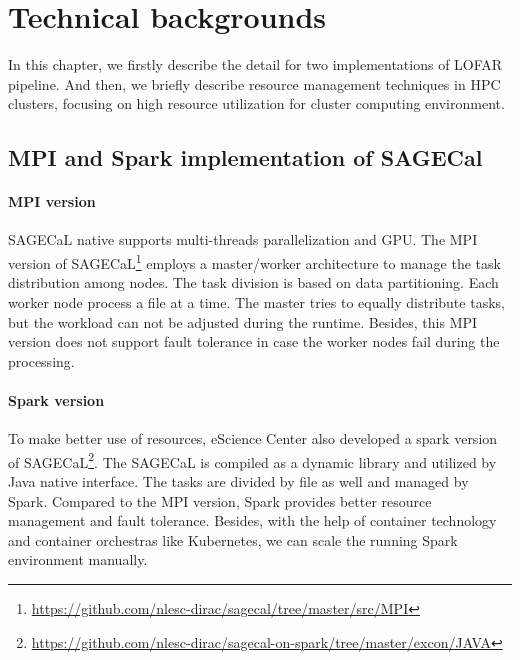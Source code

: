 
\chapter{Technical backgrounds} %



\ifpdf
    \graphicspath{{2_literaturereview/figures/PNG/}{2_literaturereview/figures/PDF/}{2_literaturereview/figures/}}
\else
    \graphicspath{{2_literaturereview/figures/EPS/}{2_literaturereview/figures/}}
\fi


% 
In this chapter, we firstly describe the detail for two implementations of LOFAR pipeline.
And then, we briefly describe resource management techniques in HPC clusters, focusing on high resource utilization for cluster computing environment.

\section{MPI and Spark implementation of SAGECal}
\subsubsection*{MPI version}
SAGECaL native supports multi-threads parallelization and GPU. The MPI version of SAGECaL\footnote{\url{https://github.com/nlesc-dirac/sagecal/tree/master/src/MPI}} employs a master/worker architecture to manage the task distribution among nodes.
The task division is based on data partitioning. Each worker node process a file at a time. 
The master tries to equally distribute tasks, but the workload can not be adjusted during the runtime.
Besides, this MPI version does not support fault tolerance in case the worker nodes fail during the processing.
\subsubsection*{Spark version}
To make better use of resources, eScience Center also developed a spark version of SAGECaL\footnote{\url{https://github.com/nlesc-dirac/sagecal-on-spark/tree/master/excon/JAVA}}.
The SAGECaL is compiled as a dynamic library and utilized by Java native interface. The tasks are divided by file as well and managed by Spark. 
Compared to the MPI version, Spark provides better resource management and fault tolerance. 
Besides, with the help of container technology and container orchestras like Kubernetes, we can scale the running Spark environment manually.

